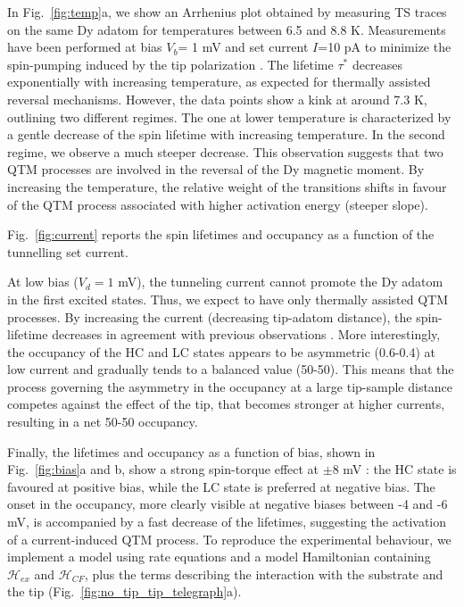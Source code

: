 \documentclass[
reprint,amsmath,amssymb,aps]{revtex4-2}
\begin{document}
In Fig.~\ref{fig:temp}a, we show an Arrhenius plot obtained by measuring TS traces on the same Dy adatom for temperatures between 6.5 and 8.8 K. Measurements have been performed at bias $V_b$= 1 mV and set current $I$=10 pA to minimize the spin-pumping induced by the tip polarization \cite{Khajetoorians2013,paul_ControlMillisecondSpin_2017}. The lifetime $\tau^{*}$ decreases exponentially with increasing temperature, as expected for thermally assisted reversal mechanisms. However, the data points show a kink at around 7.3 K, outlining two different regimes. The one at lower temperature is characterized by a gentle decrease of the spin lifetime with increasing temperature. In the second regime, we observe a much steeper decrease. This observation suggests that two QTM processes are involved in the reversal of the Dy magnetic moment. By increasing the temperature, the relative weight of the transitions shifts in favour of the QTM process associated with higher activation energy (steeper slope).

Fig.~\ref{fig:current} reports the spin lifetimes and occupancy as a function of the tunnelling set current. 

At low bias ($V_d=1$ mV), the tunneling current cannot promote the Dy adatom in the first excited states. Thus, we expect to have only thermally assisted QTM processes. By increasing the current (decreasing tip-adatom distance), the spin-lifetime decreases in agreement with previous observations \cite{paul_ControlMillisecondSpin_2017,Khajetoorians2013,krause_joule_2011}. More interestingly, the occupancy of the HC and LC states appears to be asymmetric (0.6-0.4) at low current and gradually tends to a balanced value (50-50). This means that the process governing the asymmetry in the occupancy at a large tip-sample distance competes against the effect of the tip, that becomes stronger at higher currents, resulting in a net 50-50 occupancy.

Finally, the lifetimes and occupancy as a function of bias, shown in Fig.~\ref{fig:bias}a and b, show a strong spin-torque effect at $\pm$8 mV \cite{Khajetoorians2013,delgadoSpinTransferTorqueSingle2010,balashovInelasticElectronmagnonInteraction2008,krause_joule_2011}: the HC state is favoured at positive bias, while the LC state is preferred at negative bias. The onset in the occupancy, more clearly visible at negative biases between -4 and -6 mV, is accompanied by a fast decrease of the lifetimes, suggesting the activation of a current-induced QTM process.
To reproduce the experimental behaviour, we implement a model using rate equations and a model Hamiltonian containing $\mathcal{H}_{ex}$ and $\mathcal{H}_{CF}$, plus the terms describing the interaction with the substrate and the tip (Fig.~\ref{fig:no_tip_tip_telegraph}a).
\end{document}
